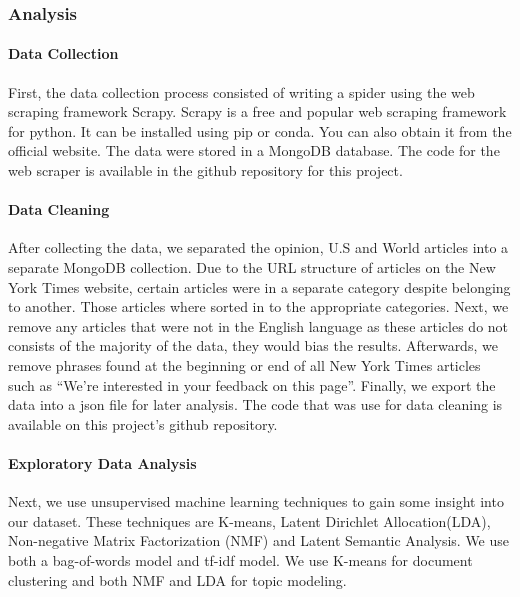 \documentclass[11pt]{article}
\begin{document}
    \subsubsection{Analysis}\label{analysis}

\paragraph{Data Collection}\label{data-collection}

First, the data collection process consisted of writing a spider using
the web scraping framework Scrapy. Scrapy is a free and popular web
scraping framework for python. It can be installed using pip or conda.
You can also obtain it from the official website. The data were stored
in a MongoDB database. The code for the web scraper is available in the
github repository for this project.

\paragraph{Data Cleaning}\label{data-cleaning}

After collecting the data, we separated the opinion, U.S and World
articles into a separate MongoDB collection. Due to the URL structure of
articles on the New York Times website, certain articles were in a
separate category despite belonging to another. Those articles where
sorted in to the appropriate categories. Next, we remove any articles
that were not in the English language as these articles do not consists
of the majority of the data, they would bias the results. Afterwards, we
remove phrases found at the beginning or end of all New York Times
articles such as ``We're interested in your feedback on this page''.
Finally, we export the data into a json file for later analysis. The
code that was use for data cleaning is available on this project's
github repository.

\paragraph{Exploratory Data Analysis}\label{exploratory-data-analysis}

Next, we use unsupervised machine learning techniques to gain some
insight into our dataset. These techniques are K-means, Latent Dirichlet
Allocation(LDA), Non-negative Matrix Factorization (NMF) and Latent
Semantic Analysis. We use both a bag-of-words model and tf-idf model. We
use K-means for document clustering and both NMF and LDA for topic
modeling.
\end{document}
